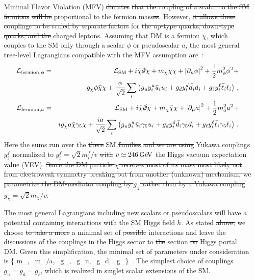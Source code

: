 Minimal Flavor Violation (MFV) \sout{dictates}  \sout{that the coupling of a scalar to the SM fermions}  \sout{will be} proportional to the fermion mass\sout{es}.  However, \sout{it allows these couplings to be scaled by separate factors}  for \sout{the up-type quarks, down-type quarks, and the}  charged leptons. Assuming that DM is a fermion $\chi$, which couples to the SM only through a scalar $\phi$ or pseudoscalar $a$, the most general tree-level Lagrangians compatible with the MFV assumption are~\cite{Cotta:2013jna,Abdullah:2014lla}:
 \begin{eqnarray}
{\cal L}_{{\rm fermion},\phi} & = & {\cal L}_{\rm SM}+i\bar{\chi} \slashed{\partial} \chi + m_\chi \bar{\chi}\chi + \left| \partial_\mu \phi \right|^2+\frac{1}{2}m_\phi^2 \phi^2 + \nonumber \\ 
& &  g_\chi \phi \bar{\chi}\chi+ \frac{\phi}{\sqrt{2}} \sum_i \left(g_u y_i^u \bar{u}_i u_i+g_d y_i^d \bar{d}_i d_i+g_\ell y_i^\ell \bar{\ell}_i \ell_i\right)\, , \label{eq:scalarlag} \\
{\cal L}_{{\rm fermion},a} & = & {\cal L}_{\rm SM}+i\bar{\chi} \slashed{\partial} \chi + m_\chi \bar{\chi}\chi + \left| \partial_\mu a \right|^2+\frac{1}{2}m_a^2 a^2 + \nonumber \\
& &  ig_\chi a \bar{\chi}\gamma_5\chi+ \frac{i a}{\sqrt{2}}\sum_i  \left(g_u y_i^u \bar{u}_i \gamma_5 u_i+g_d y_i^d \bar{d}_i \gamma_5 d_i+g_\ell y_i^\ell   \bar{\ell}_i \gamma_5 \ell_i\right) \,. \label{eq:pseudoscalarlag}
\end{eqnarray}
Here the sums run over the \sout{there}  SM \sout{families}  \sout{and we are using}  Yukawa couplings $y_i^f$  normalized to $y_i^f = \sqrt{2}m_i^f/v$ \sout{with}  $v \simeq 246 \, {\rm GeV}$  the Higgs vacuum expectation value (VEV). \sout{Since the DM particle $\chi$ receives most of its mass most likely not from electroweak symmetry breaking but from another (unknown) mechanism, we parametrize the DM-mediator coupling by $g_\chi$ rather than by a Yukawa coupling $y_\chi = \sqrt{2}m_\chi/v$.}


The most general Lagrangians including new scalars or pseudoscalars will have a potential  containing interactions with the SM Higgs field $h$. As  stated \sout{above,} we choose \sout{to take a more} a minimal set of \sout{possible} interactions and leave the discussions of the couplings in the Higgs sector to \sout{the} section \sout{on}   Higgs portal DM. Given this simplification, the minimal set of parameters under consideration is
 \bea
  \left\{ m_\chi,~ m_{\phi/a},~ g_\chi,~ g_u,~ g_d,~ g_\ell \right\} \,.
 \eea
The simplest choice of couplings    $g_u = g_d = g_\ell$, which is realized in singlet scalar extensions of the SM. 


